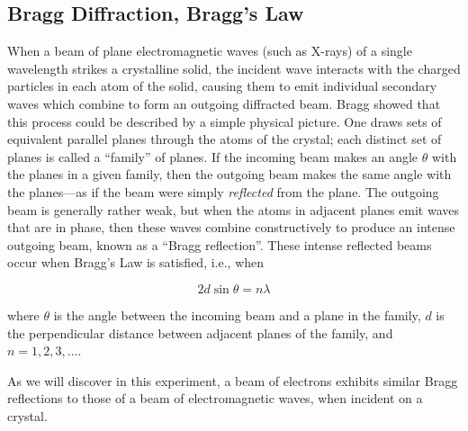 \subsection{Bragg Diffraction, Bragg's Law}

When a beam of plane electromagnetic waves (such as X-rays) of a single
wavelength strikes a crystalline solid, the incident wave interacts with the
charged particles in each atom of the solid, causing them to emit individual
secondary waves which combine to form an outgoing diffracted beam.  Bragg showed
that this process could be described by a simple physical picture.  One draws
sets of equivalent parallel planes through the atoms of the crystal; each
distinct set of planes is called a ``family'' of planes.  If the incoming beam
makes an angle $\theta$ with the planes in a given family, then the outgoing
beam makes the same angle with the planes---as if the beam were simply {\em
  reflected} from the plane.  The outgoing beam is generally rather weak, but
when the atoms in adjacent planes emit waves that are in phase, then these waves
combine constructively to produce an intense outgoing beam, known as a ``Bragg
reflection''.  These intense reflected beams occur when Bragg's Law is
satisfied, i.e., when

\begin{equation}
2 d \sin\theta = n\lambda
\label{eq:bragglaw}
\end{equation}

\noindent where $\theta$ is the angle between the incoming beam and a plane in
the family, $d$ is the perpendicular distance between adjacent planes of the
family, and $n = 1,2,3,\ldots$.

As we will discover in this experiment, a beam of electrons exhibits
similar Bragg reflections to those of a beam of electromagnetic waves,
when incident on a crystal.

